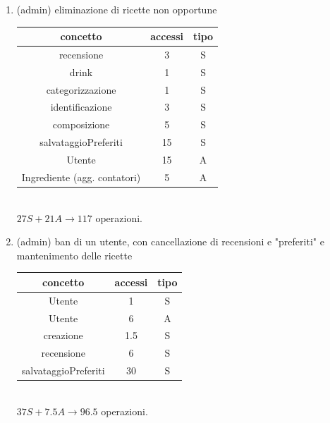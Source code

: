 \documentclass[a4paper,12pt]{report}
\begin{document}
\begin{enumerate}
    \item (admin) eliminazione di ricette non opportune\\
    \begin{tabular}{c|c|c}
    concetto & accessi & tipo\\
    \hline
        recensione & 3 & S\\
        drink & 1 & S\\
        categorizzazione & 1 & S\\
        identificazione & 3 & S\\
        composizione & 5 & S\\
        salvataggioPreferiti & 15 & S\\
        Utente  & 15 & A\\
        Ingrediente (agg. contatori) & 5 & A\\

    \hline
    \end{tabular}
    \\ $27S + 21A \to 117$ operazioni.

    \newpage
    \item (admin) ban di un utente, con cancellazione di recensioni e "preferiti" e mantenimento delle ricette\\
        \begin{tabular}{c|c|c}
    concetto & accessi & tipo\\
    \hline
        Utente & 1 & S\\
        Utente & 6 & A\\
        creazione & 1.5 & S\\
        recensione & 6 & S\\
        salvataggioPreferiti & 30 & S\\
    \hline
    \end{tabular}
    \\ $37S + 7.5A \to 96.5$ operazioni.
\end{enumerate}
\end{document}
